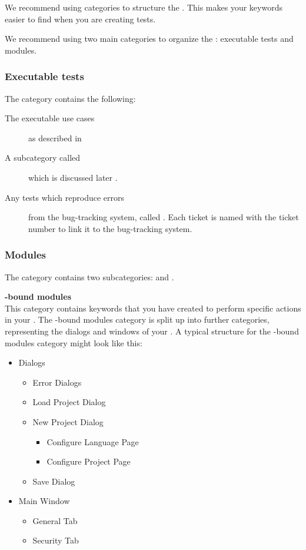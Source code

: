 We recommend using categories  to structure the \gdtestcasebrowser{}. This makes your keywords easier to find when you are creating tests. 

We recommend using two main categories to organize the \gdtestcasebrowser{}: executable tests and modules. 

\subsubsection{Executable tests}
The  category contains the following:
\begin{description}
\item [The executable use cases]{as described in }
\item [A subcategory called \bxname{\gdehandlers{}}]{which is discussed later }.
\item [Any tests which reproduce errors]{ from the bug-tracking system, called . Each ticket \gdcase{} is named with the ticket number to link it to the bug-tracking system. }
\end{description}

\subsubsection{Modules}
The  category contains two subcategories:  and . 

\textbf{\gdaut{}-bound modules}\\
This category contains keywords that you have created to perform specific actions in your \gdaut{}. The \gdaut{}-bound modules category is split up into further categories, representing the dialogs and windows of your \gdaut{}. A typical structure for the \gdaut{}-bound modules category might look like this:
\begin{itemize}
\item Dialogs
\begin{itemize}
\item Error Dialogs
\item Load Project Dialog
\item New Project Dialog
\begin{itemize}
\item Configure Language Page
\item Configure Project Page
\end{itemize}
\item Save Dialog
\end{itemize}
\item Main Window
\begin{itemize}
\item General Tab
\item Security Tab
\end{itemize}
\end{itemize}

